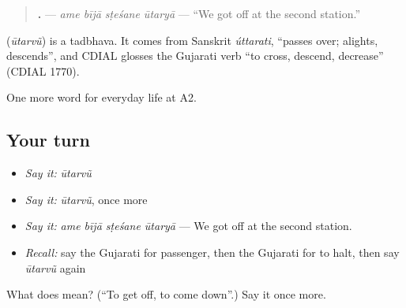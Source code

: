 \begin{quote}
\textbf{   .} — \emph{ame bījā sṭeśane ūtaryā} — \textquotedblleft{}We got off at the second station.\textquotedblright{}
\end{quote}

\begin{cousinweb}
\textbf{} (\emph{ūtarvũ}) is a tadbhava. It comes from Sanskrit \emph{úttarati}, \textquotedblleft{}passes over; alights, descends\textquotedblright{}, and CDIAL glosses the Gujarati verb \textquotedblleft{}to cross, descend, decrease\textquotedblright{} (CDIAL 1770).
\end{cousinweb}

\begin{grammarlens}[title={What you've built}]
One more word for everyday life at A2.
\end{grammarlens}

\subsection*{Your turn}
\begin{itemize}
\raggedright
  \item \emph{Say it:} \emph{ūtarvũ}
  \item \emph{Say it:} \emph{ūtarvũ}, once more
  \item \emph{Say it:} \emph{ame bījā sṭeśane ūtaryā} — We got off at the second station.
  \item \emph{Recall:} say the Gujarati for passenger, then the Gujarati for to halt, then say \emph{ūtarvũ} again
\end{itemize}

\begin{tcolorbox}[breakable,colback=teal!4,colframe=teal!35!black,title={Before you move on}]
What does  mean? (\textquotedblleft{}To get off, to come down\textquotedblright{}.) Say it once more.
\end{tcolorbox}
